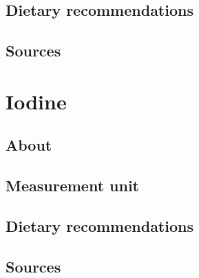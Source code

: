 \documentclass{book}
\begin{document}
\section{Dietary recommendations}


\section{Sources}


\chapter{Iodine}
\section{About}


\section{Measurement unit}


\section{Dietary recommendations}


\section{Sources}


\listoffigures
\listoftables
\end{document}
